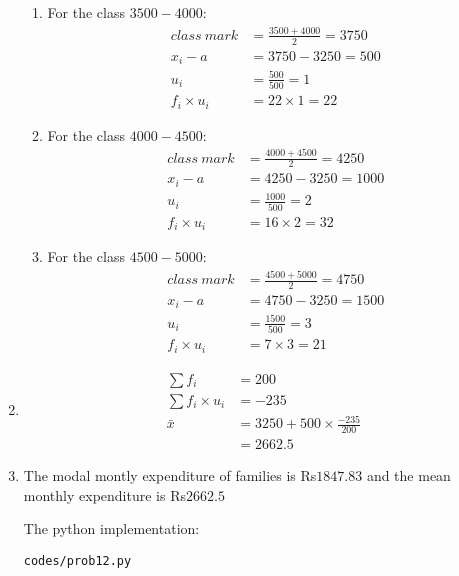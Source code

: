 \begin{enumerate}
\begin{enumerate}
\item For the class $3500-4000$:
\begin{align*}
class\ mark &= \frac{3500+4000}{2} = 3750\\
x_i - a &= 3750-3250 = 500\\
u_i &= \frac{500}{500} = 1 \\
f_i \times u_i &= 22 \times 1 = 22 
\end{align*}

\item For the class $4000-4500$:
\begin{align*}
class\ mark &= \frac{4000+4500}{2} = 4250\\
x_i - a &= 4250-3250 = 1000\\
u_i &= \frac{1000}{500} = 2\\ 
f_i \times u_i &= 16 \times 2 = 32 
\end{align*}

\item For the class $4500-5000$:
\begin{align*}
class\ mark &= \frac{4500+5000}{2} = 4750\\
x_i - a &= 4750-3250 = 1500\\
u_i &= \frac{1500}{500} = 3\\ 
f_i \times u_i &= 7 \times 3 = 21 
\end{align*}

\end{enumerate}

%


\item 
\begin{align*}
\sum f_i &= 200\\
\sum f_i \times u_i &= -235\\
\bar{x} &= 3250 + 500 \times \frac{-235}{200}\\
&=2662.5
\end{align*}

\item The modal montly expenditure of families is Rs$1847.83$ and the mean monthly expenditure is Rs$2662.5$

The python implementation:
\begin{lstlisting}
codes/prob12.py
\end{lstlisting}


\end{enumerate}

